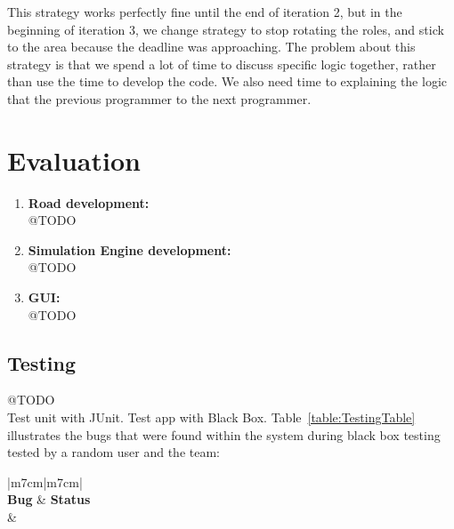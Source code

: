 \documentclass[11pt]{article}
\begin{document}
{This strategy works perfectly fine until the end of iteration 2, but in the beginning of iteration 3, we change strategy to stop rotating the roles, and stick to the area because the deadline was approaching. The problem about this strategy is that we spend a lot of time to discuss specific logic together, rather than use the time to develop the code. We also need time to explaining the logic that the previous programmer to the next programmer. 

	
\section{Evaluation} %
\begin{enumerate}
	\item \textbf{Road development:} 
	\\@TODO
	\item \textbf{Simulation Engine development:} 
	\\@TODO
	\item \textbf{GUI:} 
	\\@TODO
\end{enumerate}

\subsection{Testing} 
@TODO
\\Test unit with JUnit. Test app with Black Box. 
Table~\ref{table:TestingTable} illustrates the bugs that were found within the system during black box testing tested by a random user and the team:
\begin{center}
	\begin{table}[!htb]
	\begin{tabular}{|m{7cm}|m{7cm}|}
		 \hline
		 \\ 
		\hline 
		 \centering \textbf{Bug} & \textbf{Status}\\\hline
		 &  \\  \hline
		

\end{tabular}
\end{table}
\end{center}}
\end{document}
